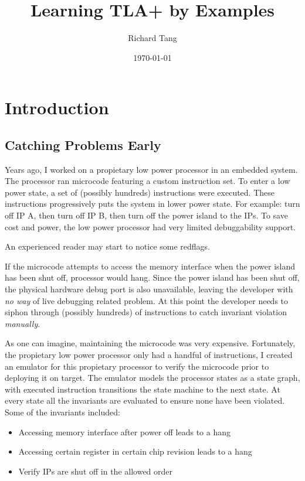 \documentclass{report}
\title{Learning TLA+ by Examples}
\author{Richard Tang}
\date{\today}
\begin{document}
\maketitle
\tableofcontents

\chapter{Introduction}

\section{Catching Problems Early}

Years ago, I worked on a propietary low power processor in an embedded system.
The processor ran microcode featuring a custom instruction set. To enter a low
power state, a set of (possibly hundreds) instructions were executed. These
instructions progressively puts the system in lower power state. For example:
turn off IP A, then turn off IP B, then turn off the power island to the IPs. To
save cost and power, the low power processor had very limited debuggability
support.\newline

An experienced reader may start to notice some redflags.\newline

If the microcode attempts to access the memory interface when the power island
has been shut off, processor would hang. Since the power island has been shut
off, the physical hardware debug port is also unavailable, leaving the developer
with \textit{no way} of live debugging related problem. At this point the
developer needs to siphon through (possibly hundreds) of instructions to catch
invariant violation \textit{manually}.\newline

As one can imagine, maintaining the microcode was very expensive. Fortunately,
the propietary low power processor only had a handful of instructions, I created
an emulator for this propietary processor to verify the microcode prior to
deploying it on target. The emulator models the processor states as a state
graph, with executed instruction transitions the state machine to the next
state. At every state all the invariants are evaluated to ensure none have been
violated. Some of the invariants included:
\begin{itemize}
    \item Accessing memory interface after power off leads to a hang
    \item Accessing certain register in certain chip revision leads to a hang 
    \item Verify IPs are shut off in the allowed order
\end{itemize}
\end{document}
